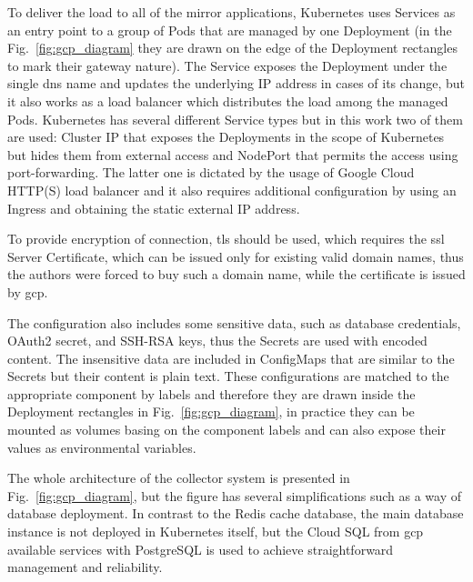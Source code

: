 To deliver the load to all of the mirror applications, Kubernetes uses Services as an entry point to a group of Pods that are managed by one Deployment (in the Fig.~\ref{fig:gcp_diagram} they are drawn on the edge of the Deployment rectangles to mark their gateway nature).
The Service exposes the Deployment under the single \gls{dns} name and updates the underlying IP address in cases of its change, but it also works as a load balancer which distributes the load among the managed Pods.
Kubernetes has several different Service types but in this work two of them are used: Cluster IP that exposes the Deployments in the scope of Kubernetes but hides them from external access and NodePort that permits the access using port-forwarding.
The latter one is dictated by the usage of Google Cloud HTTP(S) load balancer and it also requires additional configuration by using an Ingress and obtaining the static external IP address.

To provide encryption of connection, \gls{tls} should be used, which requires the \gls{ssl} Server Certificate, which can be issued only for existing valid domain names, thus the authors were forced to buy such a domain name, while the certificate is issued by \gls{gcp}.

The configuration also includes some sensitive data, such as database credentials, OAuth2 secret, and SSH-RSA keys, thus the Secrets are used with encoded content.
The insensitive data are included in ConfigMaps that are similar to the Secrets but their content is plain text.
These configurations are matched to the appropriate component by labels and therefore they are drawn inside the Deployment rectangles in Fig.~\ref{fig:gcp_diagram}, in practice they can be mounted as volumes basing on the component labels and can also expose their values as environmental variables.

The whole architecture of the collector system is presented in Fig.~\ref{fig:gcp_diagram}, but the figure has several simplifications such as a way of database deployment.
In contrast to the Redis cache database, the main database instance is not deployed in Kubernetes itself, but the Cloud SQL from \gls{gcp} available services with \mbox{PostgreSQL} is used to achieve straightforward management and reliability.
